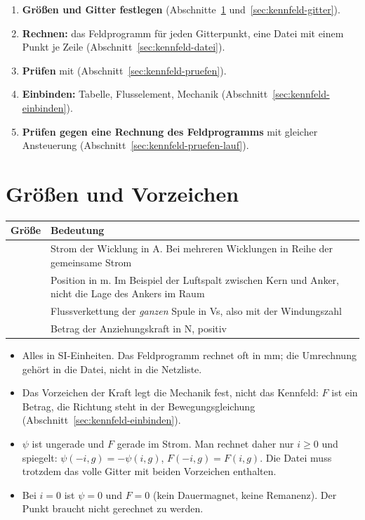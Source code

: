 \begin{enumerate}
  \item \textbf{Größen und Gitter festlegen} (Abschnitte~\ref{sec:kennfeld-groessen}
    und~\ref{sec:kennfeld-gitter}).
  \item \textbf{Rechnen:} das Feldprogramm für jeden Gitterpunkt, eine Datei mit
    einem Punkt je Zeile (Abschnitt~\ref{sec:kennfeld-datei}).
  \item \textbf{Prüfen} mit 
    (Abschnitt~\ref{sec:kennfeld-pruefen}).
  \item \textbf{Einbinden:} Tabelle, Flusselement, Mechanik
    (Abschnitt~\ref{sec:kennfeld-einbinden}).
  \item \textbf{Prüfen gegen eine Rechnung des Feldprogramms} mit gleicher
    Ansteuerung (Abschnitt~\ref{sec:kennfeld-pruefen-lauf}).
\end{enumerate}

\section{Größen und Vorzeichen}
\label{sec:kennfeld-groessen}

\begin{longtable}{@{}P{2.6cm}P{11.2cm}@{}}
  \toprule
  Größe & Bedeutung \\
  \midrule
  \endhead
  \bottomrule
  \endfoot
   & Strom der Wicklung in A. Bei mehreren Wicklungen in Reihe der gemeinsame Strom \\
   & Position in m. Im Beispiel der Luftspalt zwischen Kern und Anker, nicht die Lage des Ankers im Raum \\
   & Flussverkettung der \emph{ganzen} Spule in Vs, also mit der Windungszahl \\
   & Betrag der Anziehungskraft in N, positiv \\
\end{longtable}

\begin{itemize}
  \item Alles in SI-Einheiten. Das Feldprogramm rechnet oft in mm; die Umrechnung
    gehört in die Datei, nicht in die Netzliste.
  \item Das Vorzeichen der Kraft legt die Mechanik fest, nicht das Kennfeld:
    $F$ ist ein Betrag, die Richtung steht in der Bewegungsgleichung
    (Abschnitt~\ref{sec:kennfeld-einbinden}).
  \item $\psi$ ist ungerade und $F$ gerade im Strom. Man rechnet daher nur
    $i\ge0$ und spiegelt: $\psi(-i,g)=-\psi(i,g)$, $F(-i,g)=F(i,g)$. Die Datei
    muss trotzdem das volle Gitter mit beiden Vorzeichen enthalten.
  \item Bei $i=0$ ist $\psi=0$ und $F=0$ (kein Dauermagnet, keine Remanenz). Der
    Punkt braucht nicht gerechnet zu werden.
\end{itemize}

